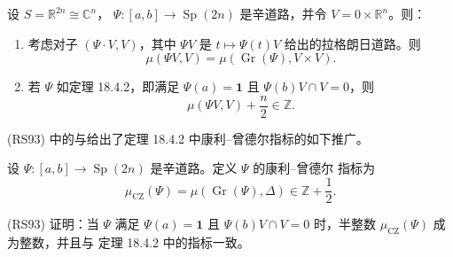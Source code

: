 \begin{theorem}
\label{thm:app-c-graph-maslov}
设 $S=\mathbb R^{2n}\cong\mathbb C^n$，
$\Psi\colon[a,b]\to\operatorname{Sp}(2n)$ 是辛道路，并令
$V=0\times\mathbb R^n$。则：
\begin{enumerate}[label=(\arabic*)]
\item 考虑对子 $(\Psi\cdot V,V)$，其中 $\Psi V$ 是
$t\mapsto\Psi(t)V$ 给出的拉格朗日道路。则
\[
 \mu(\Psi V,V)=\mu(\operatorname{Gr}(\Psi),V\times V).
\]
\item 若 $\Psi$ 如定理 18.4.2，即满足
$\Psi(a)=\mathbf1$ 且 $\Psi(b)V\cap V=0$，则
\[
 \mu(\Psi V,V)+\frac n2\in\mathbb Z.
\]
\end{enumerate}
\end{theorem}

(RS93) 中的\personRobbin{}与\personSalamon{}给出了定理 18.4.2 中康利--曾德尔指标的如下推广。

\begin{definition}
\label{def:app-c-generalized-cz}
设 $\Psi\colon[a,b]\to\operatorname{Sp}(2n)$ 是辛道路。定义 $\Psi$ 的康利--曾德尔
指标为
\[
 \mu_{\mathrm{CZ}}(\Psi)
 =\mu(\operatorname{Gr}(\Psi),\Delta)
 \in\mathbb Z+\frac12.
\]
\end{definition}

(RS93) 证明：当 $\Psi$ 满足 $\Psi(a)=\mathbf1$ 且
$\Psi(b)V\cap V=0$ 时，半整数 $\mu_{\mathrm{CZ}}(\Psi)$ 成为整数，并且与
定理 18.4.2 中的指标一致。
